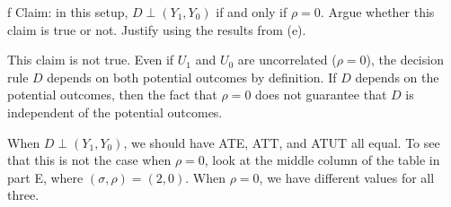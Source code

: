 \documentclass{article}
\begin{document}
\begin{problem}{f}
Claim: in this setup, $D \perp\left(Y_{1}, Y_{0}\right)$ if and only if $\rho=0$. Argue whether this claim is true or not. Justify using the results from (e).
\end{problem}
\begin{solution}
    This claim is not true. Even if $U_1$ and $U_0$ are uncorrelated ($\rho=0$), the decision rule $D$ depends on both potential outcomes by definition. If $D$ depends on the potential outcomes, then the fact that $\rho=0$ does not guarantee that $D$ is independent of the potential outcomes.
    
    When $D \perp (Y_{1}, Y_{0})$, we should have ATE, ATT, and ATUT all equal. To see that this is not the case when $\rho=0$, look at the middle column of the table in part E, where $(\sigma,\rho)=(2,0)$. When $\rho=0$, we have different values for all three.
\end{solution}


\newpage

\end{document}
